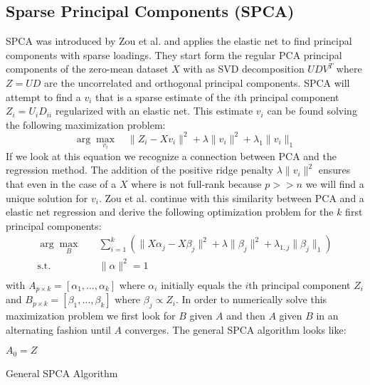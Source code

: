 \documentclass[11pt,letterpaper]{report}
\begin{document}
\subsection*{Sparse Principal Components (SPCA)}
SPCA was introduced by Zou et al. \cite{Zou2006} and applies the elastic net to find principal components with sparse loadings. They start form the regular PCA principal components of the zero-mean dataset $X$ with as SVD decomposition $UDV^T$ where $Z=UD$ are the uncorrelated and orthogonal principal components. SPCA will attempt to find a $v_i$ that is a sparse estimate of the $i$th principal component $Z_i = U_iD_{ii}$ regularized with an elastic net. This estimate $v_i$ can be found solving the following maximization problem:
\begin{equation*}
\arg\max_{v_{i}} \quad \|Z_i - X v_i\|^2 + \lambda\|v_i\|^2 + \lambda_1\|v_i\|_1
\end{equation*}
If we look at this equation we recognize a connection between PCA and the regression method. The addition of the positive ridge penalty $\lambda\|v_i\|^2$ ensures that even in the case of a $X$ where is not full-rank because $p>>n$ we will find a unique solution for $v_i$. Zou et al. continue with this similarity between PCA and a elastic net regression and derive the following optimization problem for the $k$ first principal components:
\begin{equation*}
\begin{aligned}
\arg\max_{B} \quad & \sum_{i=1}^{k} \left(\|X\alpha_j-X\beta_j\|^2 + \lambda\|\beta_j\|^2 +\lambda_{1,j} \|\beta_j\|_1\right)\\
\textrm{s.t.} \quad & \|\alpha\|^2 = 1\\
\end{aligned}
\end{equation*}
with $A_{p\times k} = [\alpha_1,\ldots,\alpha_k]$ where $\alpha_i$ initially equals the $i$th principal component $Z_i$ and $B_{p\times k} = [\beta_1,\ldots,\beta_k]$ where $\beta_j\propto Z_i$. In order to numerically solve this maximization problem we first look for $B$ given $A$ and then $A$ given $B$ in an alternating fashion until $A$ converges. The general SPCA algorithm looks like:\vspace*{1mm}\\
\begin{algorithm}[H]
\SetAlgoLined
{}
$A_0 = Z$\;
\caption{General SPCA Algorithm}
\label{algo1:SPCA}
\end{algorithm}\vspace*{1mm}
\end{document}
